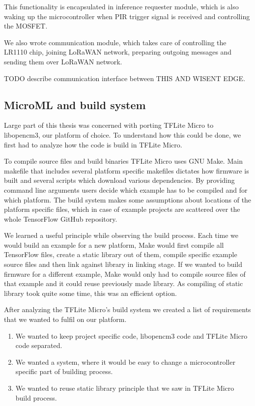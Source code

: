 This functionality is encapsulated in inference requester module, which is also waking up the microcontroller when PIR trigger signal is received and controlling the MOSFET.

We also wrote communication module, which takes care of controlling the LR1110 chip, joining LoRaWAN network, preparing outgoing messages and sending them over LoRaWAN network.

TODO describe communication interface between THIS AND WISENT EDGE.


\subsection{ MicroML and build system}

Large part of this thesis was concerned with porting TFLite Micro to libopencm3, our platform of choice.
To understand how this could be done, we first had to analyze how the code is build in TFLite Micro.

To compile source files and build binaries TFLite Micro uses GNU Make.
Main makefile that includes several platform specific makefiles dictates how firmware is built and several scripts which download various dependencies.
By providing command line arguments users decide which example has to be compiled and for which platform.
The build system makes some assumptions about locations of the platform specific files, which in case of example projects are scattered over the whole TensorFlow GitHub repository.

We learned a useful principle while observing the build process. 
Each time we would build an example for a new platform, Make would first compile all TensorFlow files, create a static library out of them, compile specific example source files and then link against library in linking stage.
If we wanted to build firmware for a different example, Make would only had to compile source files of that example and it could reuse previously made library.
As compiling of static library took quite some time, this was an efficient option.

After analyzing the TFLite Micro's build system we created a list of requirements that we wanted to fulfil on our platform.

\begin{enumerate}
    \item We wanted to keep project specific code, libopencm3 code and TFLite Micro code separated.
    \item We wanted a system, where it would be easy to change a microcontroller specific part of building process.
    \item We wanted to reuse static library principle that we saw in TFLite Micro build process.
\end{enumerate}


